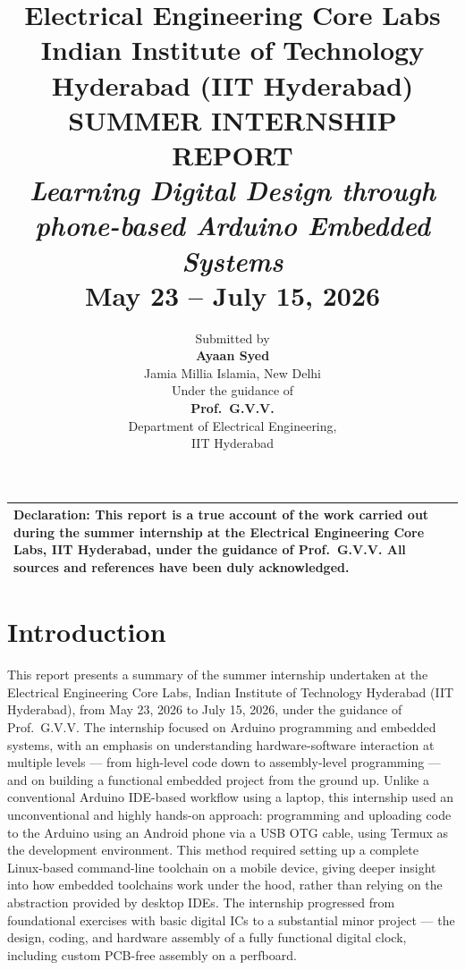 \documentclass[12pt,a4paper]{report}
\title{
    \vspace{-1.5cm}
    {\Large\textbf{Electrical Engineering Core Labs}}\\[0.3em]
    {\large Indian Institute of Technology Hyderabad (IIT Hyderabad)}\\[1.5em]
    {\Huge\textbf{SUMMER INTERNSHIP REPORT}}\\[0.8em]
    {\Large\textit{Learning Digital Design through\\phone-based Arduino Embedded Systems}}\\[1.5em]
    {\large May 23 -- July 15, 2026}
}
\author{
    Submitted by\\[0.5em]
    \textbf{Ayaan Syed}\\
    Jamia Millia Islamia, New Delhi\\[1.5em]
    Under the guidance of\\[0.5em]
    \textbf{Prof.\ G.V.V.}\\
    Department of Electrical Engineering,\\
    IIT Hyderabad
}
\date{}
\begin{document}
\maketitle
\thispagestyle{empty}
\vspace{2cm}
\begin{center}
\begin{tabular}{@{}p{}@{}}
\hline
\vspace{0.3em}
\textbf{Declaration:} This report is a true account of the work carried out during the summer internship at the Electrical Engineering Core Labs, IIT Hyderabad, under the guidance of Prof.\ G.V.V. All sources and references have been duly acknowledged.\\[0.5em]
\hline
\end{tabular}
\end{center}
\clearpage
\tableofcontents
\clearpage
{}
\chapter{Introduction}
\label{ch:intro}
This report presents a summary of the summer internship undertaken at the Electrical Engineering Core Labs, Indian Institute of Technology Hyderabad (IIT Hyderabad), from May 23, 2026 to July 15, 2026, under the guidance of Prof.\ G.V.V. The internship focused on Arduino programming and embedded systems, with an emphasis on understanding hardware-software interaction at multiple levels --- from high-level code down to assembly-level programming --- and on building a functional embedded project from the ground up.
Unlike a conventional Arduino IDE-based workflow using a laptop, this internship used an unconventional and highly hands-on approach: programming and uploading code to the Arduino using an Android phone via a USB OTG cable, using Termux as the development environment. This method required setting up a complete Linux-based command-line toolchain on a mobile device, giving deeper insight into how embedded toolchains work under the hood, rather than relying on the abstraction provided by desktop IDEs.
The internship progressed from foundational exercises with basic digital ICs to a substantial minor project --- the design, coding, and hardware assembly of a fully functional digital clock, including custom PCB-free assembly on a perfboard.
\end{document}
